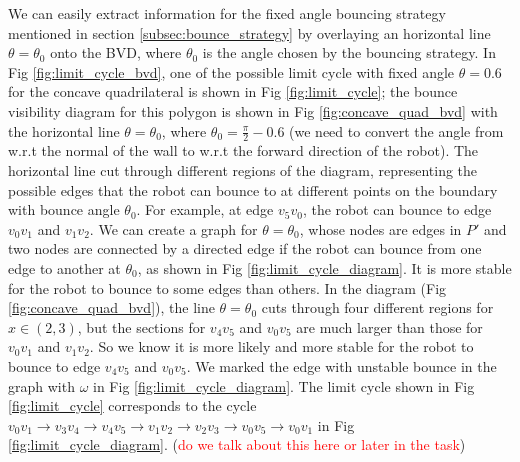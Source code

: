 \documentclass[letterpaper, 10 pt, conference]{ieeeconf}  %
\begin{document}
We can easily extract information for the fixed angle bouncing strategy
mentioned in section \ref{subsec:bounce_strategy} by overlaying an horizontal
line $\theta = \theta_0$ onto the BVD, where $\theta_0$ is the angle chosen by
the bouncing strategy. In Fig \ref{fig:limit_cycle_bvd}, one of the possible
limit cycle with fixed angle $\theta = 0.6$ for the concave quadrilateral is
shown in Fig \ref{fig:limit_cycle}; the bounce visibility diagram for this
polygon is shown in Fig \ref{fig:concave_quad_bvd} with the horizontal line
$\theta = \theta_0$, where $\theta_0 = \frac{\pi}{2}-0.6$ (we need to convert
the angle from w.r.t the normal of the wall to w.r.t the forward direction of
the robot). The horizontal line cut through different regions of the diagram,
representing the possible edges that the robot can bounce to at different points
on the boundary with bounce angle $\theta_0$. For example, at edge $v_5v_0$, the
robot can bounce to edge $v_0v_1$ and $v_1v_2$. We can create a graph for
$\theta = \theta_0$, whose nodes are edges in $P'$ and two nodes are connected
by a directed edge if the robot can bounce from one edge to another at
$\theta_0$, as shown in Fig \ref{fig:limit_cycle_diagram}. It is more stable
for the robot to bounce to some edges than others. In the diagram
(Fig \ref{fig:concave_quad_bvd}), the line $\theta = \theta_0$ cuts through
four different regions for $x \in (2, 3)$, but the sections for $v_4v_5$ and
$v_0v_5$ are much larger than those for $v_0v_1$ and $v_1v_2$. So we know it is
more likely and more stable for the robot to bounce to edge $v_4v_5$ and
$v_0v_5$. We marked the edge with unstable bounce in the graph with $\omega$ in
Fig \ref{fig:limit_cycle_diagram}. The limit cycle shown in
Fig \ref{fig:limit_cycle} corresponds to the cycle
$v_0v_1\rightarrow v_3v_4\rightarrow v_4v_5 \rightarrow v_1v_2 \rightarrow v_2v_3 \rightarrow v_0v_5 \rightarrow v_0v_1$
in Fig \ref{fig:limit_cycle_diagram}.
(\textcolor{red}{do we talk about this here or later in the task})
\end{document}
